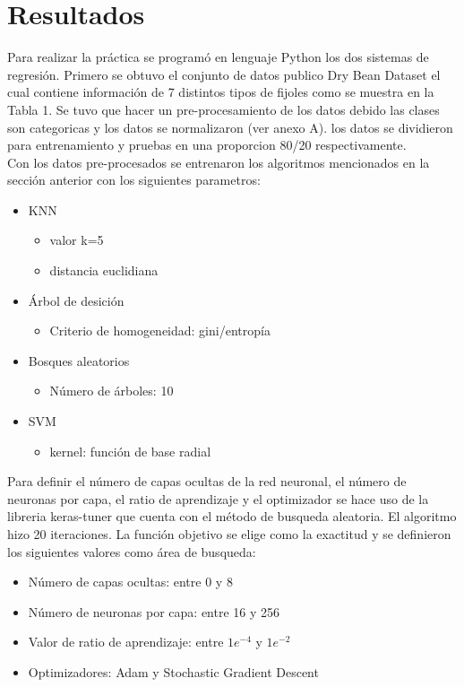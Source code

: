 \documentclass[conference]{IEEEtran}
\begin{document}
\section{Resultados}
Para realizar la práctica se programó en lenguaje Python los dos sistemas de regresión. Primero se obtuvo el conjunto de datos publico Dry Bean Dataset el cual contiene información de 7 distintos tipos de fijoles como se muestra en la Tabla 1. Se tuvo que hacer un pre-procesamiento de los datos debido las clases son categoricas y los datos se normalizaron (ver anexo A). los datos se dividieron para entrenamiento y pruebas en una proporcion 80/20 respectivamente.\\

Con los datos pre-procesados se entrenaron los algoritmos mencionados en la sección anterior con los siguientes parametros: 
\begin{itemize}
\item KNN 
\begin{itemize}
\item valor k=5
\item distancia euclidiana
\end{itemize}
\item Árbol de desición 
\begin{itemize}
\item Criterio de homogeneidad: gini/entropía
\end{itemize}
\item Bosques aleatorios
\begin{itemize}
\item Número de árboles: 10
\end{itemize}
\item SVM
\begin{itemize}
\item kernel: función de base radial 
\end{itemize}
\end{itemize}

Para definir el número de capas ocultas de la red neuronal, el número de neuronas por capa, el ratio de aprendizaje y el optimizador se hace uso de la libreria keras-tuner que cuenta con el método de busqueda aleatoria. El algoritmo hizo 20 iteraciones. La función objetivo se elige como la exactitud y se definieron los siguientes valores como área de busqueda: 

\begin{itemize}
\item Número de capas ocultas: entre 0 y 8 
\item Número de neuronas por capa: entre 16 y 256
\item Valor de ratio de aprendizaje: entre $1e^{-4}$ y $1e^{-2}$
\item Optimizadores: Adam y Stochastic Gradient Descent
\end{itemize} 
\end{document}
